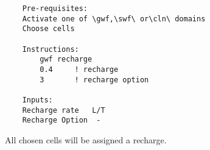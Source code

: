     \begin{verbatim}
    Pre-requisites:
    Activate one of \gwf,\swf\ or\cln\ domains
    Choose cells

    Instructions:
        gwf recharge
        0.4     ! recharge
        3       ! recharge option

    Inputs:
    Recharge rate   L/T
    Recharge Option  -
    \end{verbatim}

    All chosen cells will be assigned a recharge. 